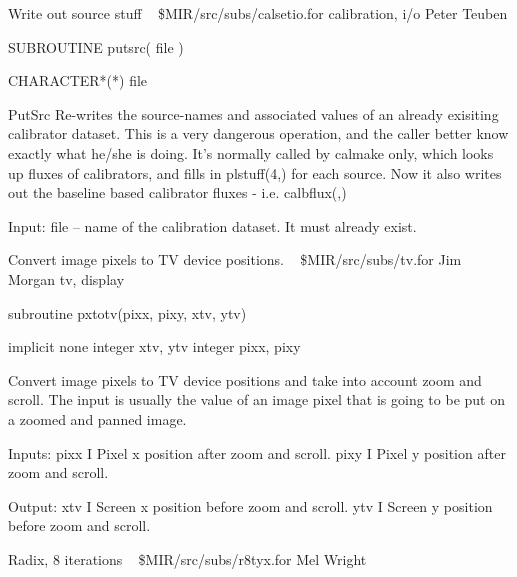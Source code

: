 %
\noindent Write out source stuff
\newline \ 
\newline {} \$MIR/src/subs/calsetio.for
\newline {} calibration, i/o
\newline {} Peter Teuben
\par{\tenpoint
{\eightpoint\begintt
        SUBROUTINE putsrc( file )

        CHARACTER*(*) file

   PutSrc Re-writes the source-names and associated values of an 
   already exisiting calibrator dataset.
   This is a very dangerous operation, and the caller better know exactly 
   what he/she is doing. It's normally called by calmake only, which looks
   up fluxes of calibrators, and fills in plstuff(4,) for each
   source.
   Now it also writes out the baseline based calibrator fluxes -
   i.e. calbflux(,)

   Input:
       file    --  name of the calibration dataset. It must already exist.
\endtt}
\par}
%
\noindent Convert image pixels to TV device positions.
\newline \ 
\newline {} \$MIR/src/subs/tv.for
\newline {} Jim Morgan
\newline \abox{Keywords:} tv, display
\par{\tenpoint
{\eightpoint\begintt
      subroutine pxtotv(pixx, pixy, xtv, ytv)

      implicit none
      integer xtv, ytv
      integer pixx, pixy

  Convert image pixels to TV device positions and take into account
  zoom and scroll.  The input is usually the value of an image pixel
  that is going to be put on a zoomed and panned image.

  Inputs:
    pixx    I     Pixel x position after zoom and scroll.
    pixy    I     Pixel y position after zoom and scroll.

  Output:
    xtv     I     Screen x position before zoom and scroll.
    ytv     I     Screen y position before zoom and scroll.
\endtt}
\par}
%
\noindent Radix, 8 iterations
\newline \ 
\newline {} \$MIR/src/subs/r8tyx.for
\newline \abox{Responsible:} Mel Wright
